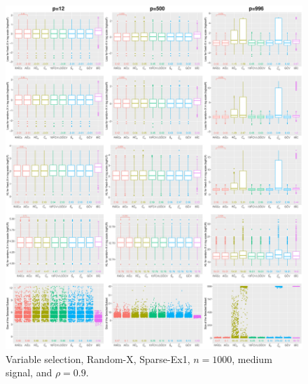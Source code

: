 \begin{figure}[!ht]
\centering
\includegraphics[width=\textwidth]{figures/supplement/randomx/subset_selection/Sparse-Ex1_n1000_msnr_rho09.eps}
\caption{Variable selection, Random-X, Sparse-Ex1, $n=1000$, medium signal, and $\rho=0.9$.}
\end{figure}
\clearpage
